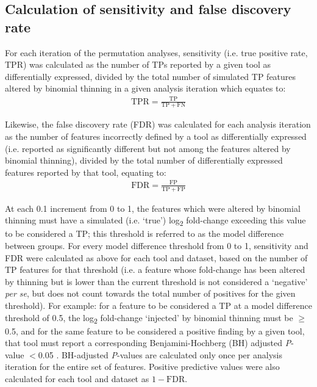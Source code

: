 \documentclass[10pt,letterpaper]{article}
\begin{document}
\subsection*{Calculation of sensitivity and false discovery rate}
For each iteration of the permutation analyses, sensitivity (i.e. true positive rate, TPR) was calculated as the number of TPs reported by a given tool as differentially expressed, divided by the total number of simulated TP features altered by binomial thinning in a given analysis iteration which equates to:
\begin{eqnarray}
	\label{eq:TPR}
	\mathrm{TPR} = \frac{\mathrm{TP}}{\mathrm{TP} + \mathrm{FN}}
 \end{eqnarray}

Likewise, the false discovery rate (FDR) was calculated for each analysis iteration as the number of features incorrectly defined by a tool as differentially expressed (i.e. reported as significantly different but not among the features altered by binomial thinning), divided by the total number of differentially expressed features reported by that tool, equating to: 
\begin{eqnarray}
	\label{eq:FDR}
	\mathrm{FDR} = \frac{\mathrm{FP}}{\mathrm{TP} + \mathrm{FP}}
 \end{eqnarray}

At each 0.1 increment from 0 to 1, the features which were altered by binomial thinning must have a simulated (i.e. `true') log\textsubscript{2} fold-change exceeding this value to be considered a TP; this threshold is referred to as the model difference between groups. For every model difference threshold from 0 to 1, sensitivity and FDR were calculated as above for each tool and dataset, based on the number of TP features for that threshold (i.e. a feature whose fold-change has been altered by thinning but is lower than the current threshold is not considered a `negative' \textit{per se}, but does not count towards the total number of positives for the given threshold). For example: for a feature to be considered a TP at a model difference threshold of 0.5, the log\textsubscript{2} fold-change `injected' by binomial thinning must be $\geq$0.5, and for the same feature to be considered a positive finding by a given tool, that tool must report a corresponding Benjamini-Hochberg (BH) adjusted \textit{P}-value $<$0.05 \cite{benjamini:1995}. BH-adjusted \textit{P}-values are calculated only once per analysis iteration for the entire set of features. Positive predictive values were also calculated for each tool and dataset as $1 - \mathrm{FDR}$.
\end{document}
